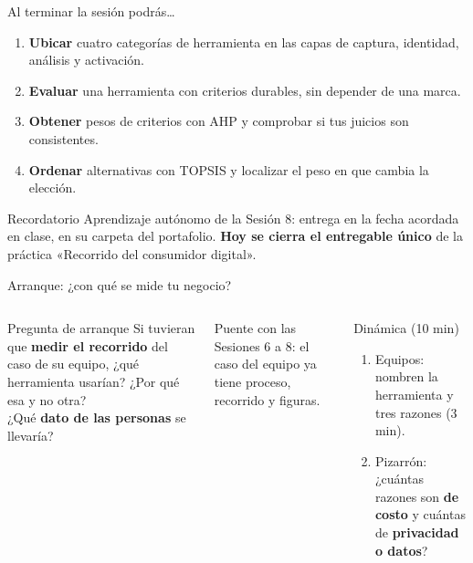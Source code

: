 \documentclass[aspectratio=169,xcolor=dvipsnames]{beamer}
\begin{document}
\begin{frame}{Al terminar la sesión podrás\ldots}
\begin{enumerate}
  \item \textbf{Ubicar} cuatro categorías de herramienta en las capas de captura, identidad, análisis y activación.
  \vspace{4pt}
  \item \textbf{Evaluar} una herramienta con criterios durables, sin depender de una marca.
  \vspace{4pt}
  \item \textbf{Obtener} pesos de criterios con AHP y comprobar si tus juicios son consistentes.
  \vspace{4pt}
  \item \textbf{Ordenar} alternativas con TOPSIS y localizar el peso en que cambia la elección.
\end{enumerate}
\vspace{6pt}
\begin{alertblock}{Recordatorio}
  Aprendizaje autónomo de la Sesión 8: entrega en la fecha acordada en clase, en su carpeta del portafolio. \textbf{Hoy se cierra el entregable único} de la práctica «Recorrido del consumidor digital».
\end{alertblock}
\end{frame}

\begin{frame}{Arranque: ¿con qué se mide tu negocio?}
\begin{columns}[T]
  \begin{exampleblock}{Pregunta de arranque}
    Si tuvieran que \textbf{medir el recorrido} del caso de su equipo, ¿qué herramienta usarían? ¿Por qué esa y no otra?\\[4pt]
    ¿Qué \textbf{dato de las personas} se llevaría?
  \end{exampleblock}
  \vspace{4pt}
  {\small\color{IPNgris} Puente con las Sesiones 6 a 8: el caso del equipo ya tiene proceso, recorrido y figuras.}
  \begin{block}{Dinámica (10 min)}
    \small
    \begin{enumerate}
      \item Equipos: nombren la herramienta y tres razones (3 min).
      \item Pizarrón: ¿cuántas razones son \textbf{de costo} y cuántas de \textbf{privacidad o datos}?
    \end{enumerate}
  \end{block}
\end{columns}
\end{frame}
\end{document}
